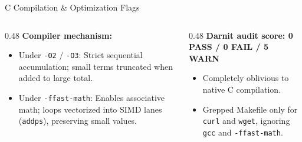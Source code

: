 \documentclass[aspectratio=169]{beamer}
\begin{document}
\begin{frame}{C Compilation \& Optimization Flags}
    \vspace{0.3cm}
    \begin{columns}[T]
        \begin{column}{0.48\textwidth}
            \footnotesize
            \textbf{Compiler mechanism:}
            \begin{itemize}
                \item Under \texttt{-O2} / \texttt{-O3}: Strict sequential accumulation; small terms truncated when added to large total.
                \item Under \texttt{-ffast-math}: Enables associative math; loops vectorized into SIMD lanes (\texttt{addps}), preserving small values.
            \end{itemize}
        \end{column}
        \begin{column}{0.48\textwidth}
            \footnotesize
            \textbf{Darnit audit score: 0 PASS / 0 FAIL / 5 WARN}
            \begin{itemize}
                \item Completely oblivious to native C compilation.
                \item Grepped Makefile only for \texttt{curl} and \texttt{wget}, ignoring \texttt{gcc} and \texttt{-ffast-math}.
            \end{itemize}
        \end{column}
    \end{columns}
\end{frame}
\end{document}
